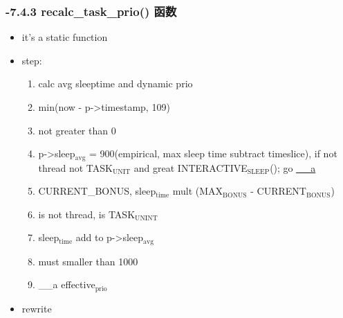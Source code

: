 \documentclass[11pt]{article}
\begin{document}
\subsubsection{-7.4.3 recalc\_task\_prio() 函数}
\label{sec-2.4.3}

\begin{itemize}
\item it's a static function
\item step:

\begin{enumerate}
\item calc avg sleeptime and dynamic prio
\item min(now - p->timestamp, 109)
\item not greater than 0
\item p->sleep$_{\mathrm{avg}}$ = 900(empirical, max sleep time subtract timeslice), if not
     thread not TASK$_{\mathrm{UNIT}}$ and great INTERACTIVE$_{\mathrm{SLEEP}}$(); go \hyperref[sec-2.4.3]{__a}
\item CURRENT\_BONUS, sleep$_{\mathrm{time}}$ mult (MAX$_{\mathrm{BONUS}}$ - CURRENT$_{\mathrm{BONUS}}$)
\item is not thread, is TASK$_{\mathrm{UNINT}}$
\item sleep$_{\mathrm{time}}$ add to p->sleep$_{\mathrm{avg}}$
\item must smaller than 1000
\item __a effective$_{\mathrm{prio}}$
\end{enumerate}

\item rewrite
\end{itemize}
\end{document}
